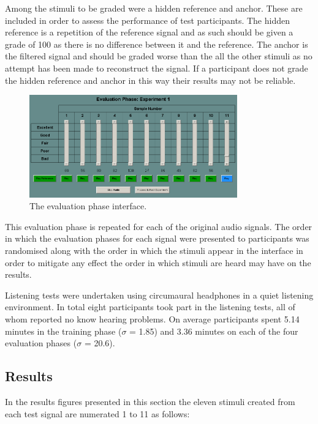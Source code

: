 			Among the stimuli to be graded were a hidden reference and anchor. These are included in order to
			assess the performance of test participants. The hidden reference is a repetition of the reference
			signal and as such should be given a grade of 100 as there is no difference between it and the
			reference. The anchor is the filtered signal and should be graded worse than the all the other
			stimuli as no attempt has been made to reconstruct the signal. If a participant does not grade the
			hidden reference and anchor in this way their results may not be reliable.

			\begin{figure}[h!]
				\centering
				\includegraphics[width=0.8\textwidth]{chapter7/Images/MushraEvaluation.png}
				\caption{The evaluation phase interface.}
				\label{fig:MushraEvaluation}
			\end{figure}

			This evaluation phase is repeated for each of the original audio signals. The order in which the
			evaluation phases for each signal were presented to participants was randomised along with the
			order in which the stimuli appear in the interface in order to mitigate any effect the order in
			which stimuli are heard may have on the results.

			Listening tests were undertaken using circumaural headphones in a quiet listening environment. In
			total eight participants took part in the listening tests, all of whom reported no know hearing
			problems. On average participants spent 5.14 minutes in the training phase ($\sigma$ = 1.85) and
			3.36 minutes on each of the four evaluation phases ($\sigma$ = 20.6).

	\subsection{Results}
	\label{sec:PerceptualExperiments-Reconstruction-Results}
		In the results figures presented in this section the eleven stimuli created from each test signal are
		numerated 1 to 11 as follows:

